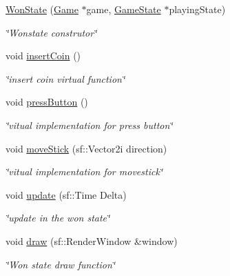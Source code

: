 \begin{DoxyCompactItemize}
\item 
\hyperlink{classWonState_aec908e9c1dadd32d8efd8266010ec324}{Won\+State} (\hyperlink{classGame}{Game} $\ast$game, \hyperlink{classGameState}{Game\+State} $\ast$playing\+State)
\begin{DoxyCompactList}\small\item\em \char`\"{}\+Wonstate construtor\char`\"{} \end{DoxyCompactList}\item 
\mbox{\label{classWonState_aeaab03fa1a39188c19107047417c65b6}} 
void \hyperlink{classWonState_aeaab03fa1a39188c19107047417c65b6}{insert\+Coin} ()
\begin{DoxyCompactList}\small\item\em \char`\"{}insert coin virtual function\char`\"{} \end{DoxyCompactList}\item 
\mbox{\label{classWonState_ab17f101d9ab90e60259e28b8775a76ec}} 
void \hyperlink{classWonState_ab17f101d9ab90e60259e28b8775a76ec}{press\+Button} ()
\begin{DoxyCompactList}\small\item\em \char`\"{}vitual implementation for press button\char`\"{} \end{DoxyCompactList}\item 
\mbox{\label{classWonState_a337f17bbc305e4e68784491605d70a38}} 
void \hyperlink{classWonState_a337f17bbc305e4e68784491605d70a38}{move\+Stick} (sf\+::\+Vector2i direction)
\begin{DoxyCompactList}\small\item\em \char`\"{}vitual implementation for movestick\char`\"{} \end{DoxyCompactList}\item 
void \hyperlink{classWonState_a81880fd5e0c94b8d477ba747a23bd475}{update} (sf\+::\+Time Delta)
\begin{DoxyCompactList}\small\item\em \char`\"{}update in the won state\char`\"{} \end{DoxyCompactList}\item 
void \hyperlink{classWonState_ad3c7505c55d3d21aae48a64707d34f8b}{draw} (sf\+::\+Render\+Window \&window)
\begin{DoxyCompactList}\small\item\em \char`\"{}\+Won state draw function\char`\"{} \end{DoxyCompactList}\end{DoxyCompactItemize}
